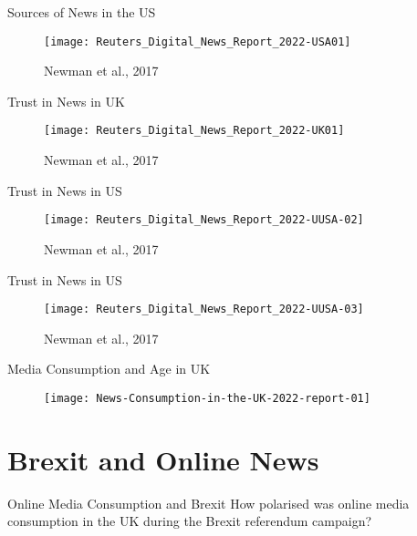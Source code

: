 \documentclass{beamer}
\begin{document}
\begin{frame}{Sources of News in the US}
    \begin{figure}
        \centering
        \texttt{[image: Reuters\_Digital\_News\_Report\_2022-USA01]}
        \caption{Newman et al., 2017}
        \label{fig:my_label}
    \end{figure}
\end{frame}


\begin{frame}{Trust in News in UK}
    \begin{figure}
        \centering
        \texttt{[image: Reuters\_Digital\_News\_Report\_2022-UK01]}
        \caption{Newman et al., 2017}
        \label{fig:my_label}
    \end{figure}
\end{frame}

\begin{frame}{Trust in News in US}
    \begin{figure}
        \centering
        \texttt{[image: Reuters\_Digital\_News\_Report\_2022-UUSA-02]}
        \caption{Newman et al., 2017}
        \label{fig:my_label}
    \end{figure}
\end{frame}

\begin{frame}{Trust in News in US}
    \begin{figure}
        \centering
        \texttt{[image: Reuters\_Digital\_News\_Report\_2022-UUSA-03]}
        \caption{Newman et al., 2017}
        \label{fig:my_label}
    \end{figure}
\end{frame}


\begin{frame}{Media Consumption and Age in UK}
    \begin{figure}
        \centering
        \texttt{[image: News-Consumption-in-the-UK-2022-report-01]}
        \label{fig:my_label}
    \end{figure}
\end{frame}

\section{Brexit and Online News}

\begin{frame}{Online Media Consumption and Brexit}
    How polarised was online media consumption in the UK during the Brexit referendum campaign?
\end{frame}
\end{document}
